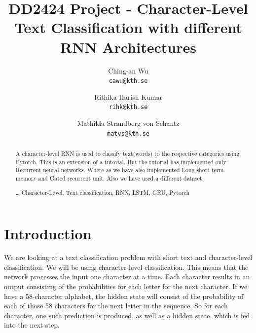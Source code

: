 \documentclass[runningheads]{llncs}
\begin{document}
\pagestyle{headings}
\mainmatter
\def\ECCV16SubNumber{***}
\title{DD2424 Project - Character-Level Text Classification with different RNN Architectures}
\author{
	Ching-an Wu\\
    {\tt cawu@kth.se}
    \and
    Rithika Harish Kumar\\
    {\tt rihk@kth.se}
    \and
	Mathilda Strandberg von Schantz\\
    {\tt matvs@kth.se}
}

\maketitle


\begin{abstract}

A character-level RNN is used to classify text(words) to the respective categories using Pytorch. This is an extension of a tutorial\cite{maintutorial}. But the tutorial has implemented only Recurrent neural networks. Where as we have also implemented Long short term memory and Gated recurrent unit. Also we have used a different dataset.   

\dots
{}
Character-Level, Text classification, RNN, LSTM, GRU, Pytorch 
\end{abstract}


\section{Introduction}


We are looking at a text classification problem with short text and character-level classification. We will be using character-level classification. This means that the network processes the input one character at a time. Each character results in an output consisting of the probabilities for each letter for the next character. If we have a 58-character alphabet, the hidden state will consist of the probability of each of those 58 characters for the next letter in the sequence. So for each character, one such prediction is produced, as well as a hidden state, which is fed into the next step.
\end{document}
